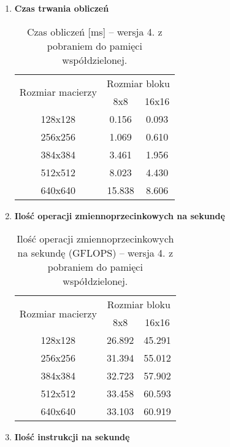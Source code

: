 \begin{enumerate}[(a)]
\begin{enumerate}[1.]
\item \textbf{Czas trwania obliczeń} \newline

\begin{table}[H]
\centering
\begin{tabular}{|c|c|c|}
\hline
\multirow{2}{*}{Rozmiar macierzy} & \multicolumn{2}{c|}{Rozmiar bloku} \\ \cline{2-3}
& 8x8 & 16x16 \\ \hline
128x128 & 0.156 & 0.093 \\ \hline
256x256 & 1.069 & 0.610 \\ \hline
384x384 & 3.461 & 1.956 \\ \hline
512x512 & 8.023 & 4.430 \\ \hline
640x640 & 15.838 & 8.606 \\ \hline
\end{tabular}
\caption{Czas obliczeń [ms] -- wersja 4. z pobraniem do pamięci współdzielonej.}
\end{table}

\item \textbf{Ilość operacji zmiennoprzecinkowych na sekundę} \newline

\begin{table}[H]
\centering
\begin{tabular}{|c|c|c|}
\hline
\multirow{2}{*}{Rozmiar macierzy} & \multicolumn{2}{c|}{Rozmiar bloku} \\ \cline{2-3}
& 8x8 & 16x16 \\ \hline
128x128 & 26.892 & 45.291 \\ \hline
256x256 & 31.394 & 55.012 \\ \hline
384x384 & 32.723 & 57.902 \\ \hline
512x512 & 33.458 & 60.593 \\ \hline
640x640 & 33.103 & 60.919 \\ \hline
\end{tabular}
\caption{Ilość operacji zmiennoprzecinkowych na sekundę (GFLOPS) -- wersja 4. z pobraniem do pamięci współdzielonej.}
\end{table}

\item \textbf{Ilość instrukcji na sekundę} \newline


\end{enumerate}
\end{enumerate}
